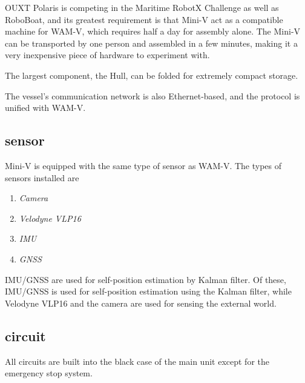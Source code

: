 \documentclass[lettersize,journal]{IEEEtran}
\begin{document}
OUXT Polaris is competing in the Maritime RobotX Challenge as well as RoboBoat, and its greatest requirement is that Mini-V act as a compatible machine for WAM-V, which requires half a day for assembly alone.
The Mini-V can be transported by one person and assembled in a few minutes, making it a very inexpensive piece of hardware to experiment with.

The largest component, the Hull, can be folded for extremely compact storage.

The vessel's communication network is also Ethernet-based, and the protocol is unified with WAM-V.

\subsection{sensor}

Mini-V is equipped with the same type of sensor as WAM-V.
The types of sensors installed are

\begin{enumerate}
  \item {\it Camera}
  \item {\it Velodyne VLP16}
  \item {\it IMU} 
  \item {\it GNSS}
\end{enumerate}

IMU/GNSS are used for self-position estimation by Kalman filter.
Of these, IMU/GNSS is used for self-position estimation using the Kalman filter, while Velodyne VLP16 and the camera are used for sensing the external world.

\subsection{circuit}

All circuits are built into the black case of the main unit except for the emergency stop system.
\end{document}
